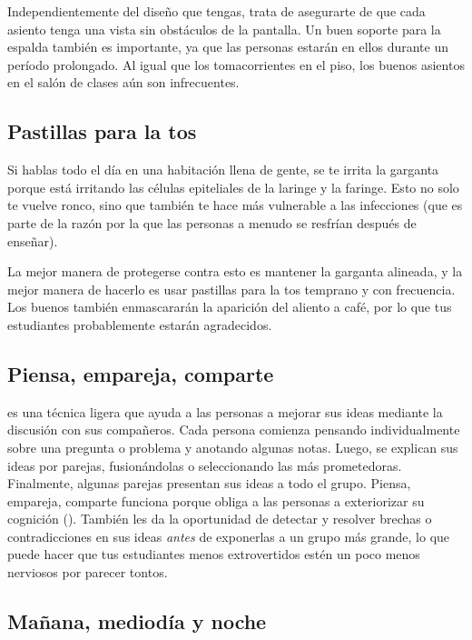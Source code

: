 Independientemente del diseño que tengas,
trata de asegurarte de que cada asiento tenga una vista sin obstáculos de la pantalla.
Un buen soporte para la espalda también es importante,
ya que las personas estarán en ellos durante un período prolongado.
Al igual que los tomacorrientes en el piso,
los buenos asientos en el salón de clases aún son infrecuentes.

\subsection*{Pastillas para la tos}

Si hablas todo el día en una habitación llena de gente,
se te irrita la garganta porque está irritando las células epiteliales de la laringe y la faringe.
Esto no solo te vuelve ronco, sino que también te hace más vulnerable a las infecciones
(que es parte de la razón por la que las personas a menudo se resfrían después de enseñar).

La mejor manera de protegerse contra esto es mantener la garganta alineada,
y la mejor manera de hacerlo es usar pastillas para la tos temprano y con frecuencia.
Los buenos también enmascararán la aparición del aliento a café,
por lo que tus estudiantes probablemente estarán agradecidos.

\subsection*{Piensa, empareja, comparte}

 es una técnica ligera
que ayuda a las personas a mejorar sus ideas
mediante la discusión con sus compañeros.
Cada persona comienza pensando individualmente sobre una pregunta o problema
y anotando algunas notas.
Luego, se explican sus ideas por parejas,
fusionándolas o seleccionando las más prometedoras.
Finalmente,
algunas parejas presentan sus ideas a todo el grupo.
Piensa, empareja, comparte funciona porque obliga a las personas a exteriorizar su cognición
().
También les da la oportunidad de detectar y resolver brechas o contradicciones en sus ideas
\emph{antes} de exponerlas a un grupo más grande,
lo que puede hacer que tus estudiantes menos extrovertidos estén un poco menos nerviosos
por parecer tontos.

\subsection*{Mañana, mediodía y noche}

